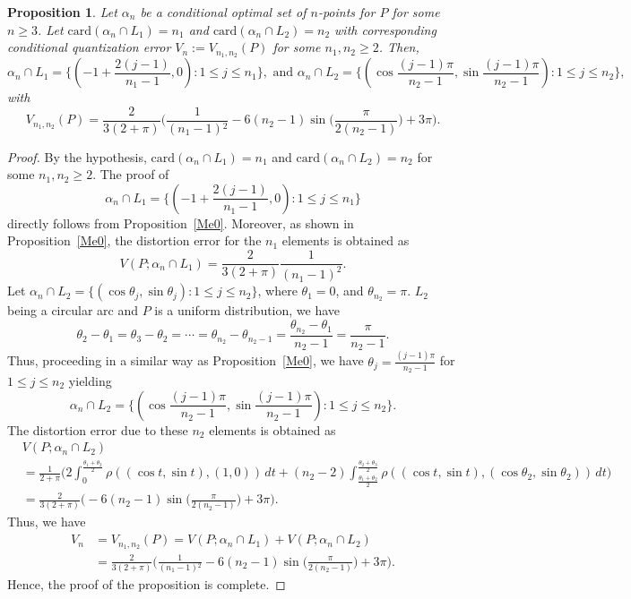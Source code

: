 \documentclass[12pt, reqno]{amsart}
\theoremstyle{plain}
\newtheorem{prop}[subsection]{Proposition}
\theoremstyle{definition}
\newcommand{\ii}{\cap}%
\newcommand{\set}[1]{\{#1\}}%
\newcommand{\ga}{\alpha}
\newcommand{\gq}{\theta}
\newcommand{\te}{\text}%
\begin{document}
\begin{prop} \label{Me1} 
Let $\ga_n$ be a conditional optimal set of $n$-points for $P$ for some $n\geq 3$. Let $\te{card}(\ga_n\ii L_1)=n_1$  and $\te{card}(\ga_n\ii L_2)=n_2$  with corresponding conditional quantization error $V_n:=V_{n_1, n_2}(P)$ for some $n_1, n_2\geq 2$. Then, 
\[\ga_n\ii L_1=\set{(-1+\frac{2(j-1)}{n_1-1}, 0) : 1\leq j\leq n_1}, \te{ and } \ga_n\ii L_2=\set{(\cos \frac{(j-1)\pi}{n_2-1}, \sin\frac {(j-1)\pi}{n_2-1}) : 1\leq j\leq n_2},\]
with  
\[V_{n_1, n_2}(P)=\frac{2}{3 (2+\pi )} \Big(\frac{1}{(n_1-1){}^2}-6 (n_2-1) \sin \Big(\frac{\pi }{2(n_2-1)}\Big)+3 \pi \Big).\]
\end{prop} 
 
 \begin{proof}
By the hypothesis,  $\te{card}(\ga_n\ii L_1)=n_1$  and $\te{card}(\ga_n\ii L_2)=n_2$ for some $n_1, n_2\geq 2$. The proof of 
\[\ga_n\ii L_1=\set{(-1+\frac{2(j-1)}{n_1-1}, 0) : 1\leq j\leq n_1}\]
directly follows from Proposition~\ref{Me0}. Moreover, as shown in Proposition~\ref{Me0}, the distortion error for the $n_1$ elements is obtained as 
\[V(P; \ga_n\ii L_1)=\frac 2{3(2+\pi)}  \frac {1}{(n_1-1)^2}.\]
Let $\ga_n\ii L_2=\set{(\cos \gq_j, \sin \gq_j) : 1\leq j\leq n_2}$,
where $\gq_1=0$, and $\gq_{n_2}=\pi$. 
$L_2$ being a circular arc and $P$ is a uniform distribution, we have 
\[\gq_2-\gq_1=\gq_3-\gq_2=\cdots=\gq_{n_2}-\gq_{n_2-1}=\frac{\gq_{n_2}-\gq_1}{n_2-1}=\frac \pi {n_2-1}.\]
Thus, proceeding in a similar way as Proposition~\ref{Me0}, we have 
$\gq_j=\frac{(j-1)\pi}{n_2-1}$ for $1\leq j\leq n_2$ yielding 
\[\ga_n\ii L_2=\set{(\cos \frac{(j-1)\pi}{n_2-1}, \sin\frac {(j-1)\pi}{n_2-1}) : 1\leq j\leq n_2}.\]
The distortion error due to these $n_2$ elements is obtained as 
\begin{align*}
&V(P; \ga_n\ii L_2)\\
&=\frac 1{2+\pi} \Big(2\int_{0}^{\frac{\gq_1+\gq_2}{2}} \rho((\cos t, \sin t), (1, 0))\,dt+(n_2-2) \int_{\frac  {\gq_1+\gq_2}2}^{\frac  {\gq_2+\gq_3}2} \rho((\cos t, \sin t), (\cos \gq_2, \sin \gq_2))\,dt\Big)\\
&=\frac{2}{3 (2+\pi )} \Big(-6 (n_2-1) \sin \Big(\frac{\pi }{2(n_2-1)}\Big)+3 \pi \Big).
\end{align*} 
Thus, we have 
\begin{align*}
V_n&=V_{n_1, n_2}(P)=V(P; \ga_n\ii L_1)+V(P; \ga_n\ii L_2)\\
&=  \frac{2}{3 (2+\pi )} \Big(\frac{1}{(n_1-1){}^2}-6 (n_2-1) \sin \Big(\frac{\pi }{2(n_2-1)}\Big)+3 \pi \Big).
\end{align*} 
Hence, the proof of the proposition is complete. 
\end{proof} 
\end{document}
